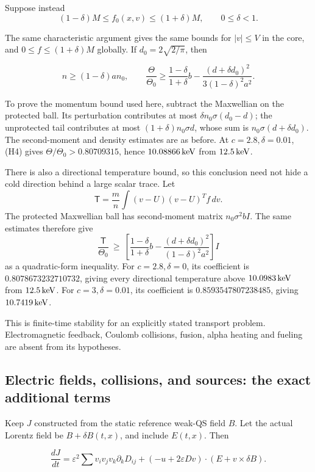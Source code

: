 Suppose instead \[
(1-\delta)M\le f_0(x,v)\le(1+\delta)M,\qquad 0\le\delta<1.
\]

The same characteristic argument gives the same bounds for \(|v|\le V\)
in the core, and \(0\le f\le(1+\delta)M\) globally. If
\(d_0=2\sqrt{2/\pi}\), then

\[
n\ge(1-\delta)a n_0,\qquad
\frac{\Theta}{\Theta_0}\ge
\frac{1-\delta}{1+\delta}b
-\frac{(d+\delta d_0)^2}{3(1-\delta)^2a^2}.
\tag{H4}
\]

To prove the momentum bound used here, subtract the Maxwellian on the
protected ball. Its perturbation contributes at most
\(\delta n_0\sigma(d_0-d)\); the unprotected tail contributes at most
\((1+\delta)n_0\sigma d\), whose sum is \(n_0\sigma(d+\delta d_0)\). The
second-moment and density estimates are as before. At
\(c=2.8,\delta=0.01\), (H4) gives
\(\Theta/\Theta_0>0.80709315\), hence \(10.08866\,{\rm keV}\)
from \(12.5\,{\rm keV}\).

There is also a directional temperature bound, so this conclusion need
not hide a cold direction behind a large scalar trace. Let \[
\mathsf T=\frac mn\int(v-U)(v-U)^Tf\,dv.
\] The protected Maxwellian ball has second-moment matrix
\(n_0\sigma^2bI\). The same estimates therefore give \[
\frac{\mathsf T}{\Theta_0}\ \ge\
\left[\frac{1-\delta}{1+\delta}b
-\frac{(d+\delta d_0)^2}{(1-\delta)^2a^2}\right]I
\tag{H5}
\] as a quadratic-form inequality. For \(c=2.8,\delta=0\), its
coefficient is \(0.8078673232710732\), giving every directional
temperature above \(10.0983\,{\rm keV}\) from \(12.5\,{\rm keV}\). For
\(c=3,\delta=0.01\), its coefficient is \(0.8593547807238485\), giving
\(10.7419\,{\rm keV}\).

This is finite-time stability for an explicitly stated transport
problem. Electromagnetic feedback, Coulomb collisions, fusion, alpha
heating and fueling are absent from its hypotheses.

\subsection{Electric fields, collisions, and sources: the exact
additional
terms}\label{electric-fields-collisions-and-sources-the-exact-additional-terms}

Keep \(J\) constructed from the static reference weak-QS field \(B\).
Let the actual Lorentz field be \(B+\delta B(t,x)\), and include
\(E(t,x)\). Then

\[
\frac{dJ}{dt}
=\varepsilon^2\sum v_iv_jv_k\partial_kD_{ij}
 +(-u+2\varepsilon Dv)\cdot(E+v\times\delta B).
\tag{P1}
\]

